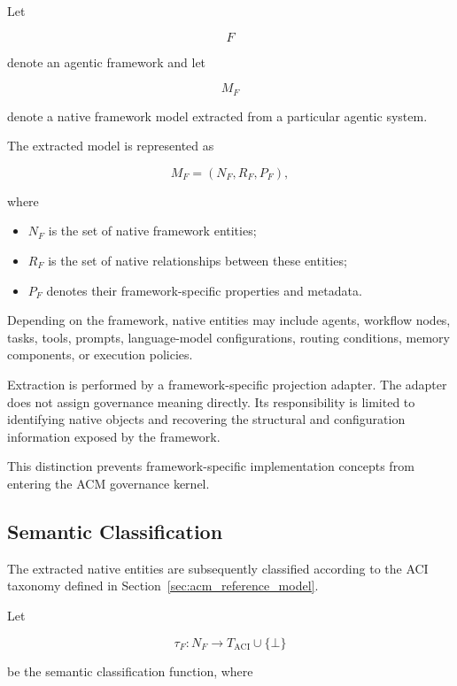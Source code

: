 \documentclass[10pt]{article}
\begin{document}
Let

\[
F
\]

denote an agentic framework and let

\[
M_F
\]

denote a native framework model extracted from a particular agentic system.

The extracted model is represented as

\begin{equation}
	M_F=(N_F,R_F,P_F),
\end{equation}

where

\begin{itemize}
	\item $N_F$ is the set of native framework entities;
	\item $R_F$ is the set of native relationships between these entities;
	\item $P_F$ denotes their framework-specific properties and metadata.
\end{itemize}

Depending on the framework, native entities may include agents, workflow nodes,
tasks, tools, prompts, language-model configurations, routing conditions,
memory components, or execution policies.

Extraction is performed by a framework-specific projection adapter. The adapter
does not assign governance meaning directly. Its responsibility is limited to
identifying native objects and recovering the structural and configuration
information exposed by the framework.

This distinction prevents framework-specific implementation concepts from
entering the ACM governance kernel.

\subsection{Semantic Classification}

The extracted native entities are subsequently classified according to the ACI
taxonomy defined in Section~\ref{sec:acm_reference_model}.

Let

\begin{equation}
	\tau_F :
	N_F
	\rightarrow
	T_{\mathrm{ACI}}
	\cup
	\{\bot\}
\end{equation}

be the semantic classification function, where
\end{document}
